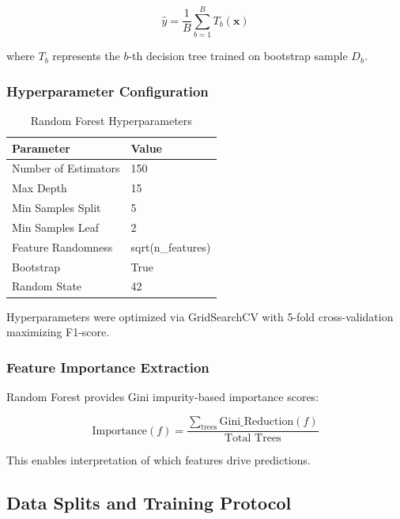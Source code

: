 \documentclass[conference]{IEEEtran}
\begin{document}
\begin{equation}
\hat{y} = \frac{1}{B} \sum_{b=1}^{B} T_b(\mathbf{x})
\end{equation}

where $T_b$ represents the $b$-th decision tree trained on bootstrap sample $D_b$.

\subsubsection{Hyperparameter Configuration}

\begin{table}[h]
\centering
\small
\setlength{\tabcolsep}{4pt}
\begin{tabular}{ll}
\toprule
\textbf{Parameter} & \textbf{Value} \\
\midrule
Number of Estimators & 150 \\
Max Depth & 15 \\
Min Samples Split & 5 \\
Min Samples Leaf & 2 \\
Feature Randomness & sqrt(n\_features) \\
Bootstrap & True \\
Random State & 42 \\
\bottomrule
\end{tabular}
\caption{Random Forest Hyperparameters}
\label{tab:hparams}
\end{table}

Hyperparameters were optimized via GridSearchCV with 5-fold cross-validation maximizing F1-score.

\subsubsection{Feature Importance Extraction}

Random Forest provides Gini impurity-based importance scores:

\begin{equation}
\text{Importance}(f) = \frac{\sum_{\text{trees}} \text{Gini\_Reduction}(f)}{\text{Total Trees}}
\end{equation}

This enables interpretation of which features drive predictions.

\subsection{Data Splits and Training Protocol}
\end{document}
